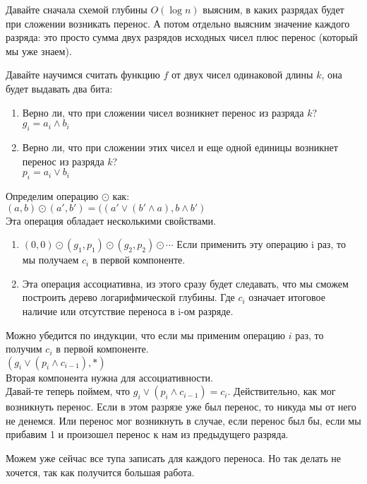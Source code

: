 Давайте сначала схемой глубины $O(\log n)$ выясним, в каких разрядах будет при сложении возникать перенос.
А потом отдельно выясним значение каждого разряда: это просто сумма двух разрядов исходных чисел плюс перенос (который мы уже знаем).

Давайте научимся считать функцию $f$ от двух чисел одинаковой длины $k$, она будет выдавать два бита:
\begin{enumerate}
	\item Верно ли, что при сложении чисел возникнет перенос из разряда $k$?\\
	$g_i = a_i \wedge b_i$
	\item Верно ли, что при сложении этих чисел и еще одной единицы возникнет перенос из разряда $k$?\\
	$p_i = a_i \vee b_i$
\end{enumerate}

Определим операцию $\odot$ как:\\
$(a, b) \odot (a', b') = ((a' \vee (b' \wedge a), b \wedge b')$\\

Эта операция обладает несколькими свойствами. 
 
\begin{enumerate}
	\item $(0, 0) \odot (g_1, p_1) \odot (g_2, p_2) \odot \cdots$
	Если применить эту операцию i раз, то мы получаем $c_i$ в первой компоненте.
	\item Эта операция ассоциативна, из этого сразу будет следавать, что мы 
	сможем построить дерево логарифмической глубины. Где $c_i$ означает итоговое наличие или отсутствие переноса в i-ом разряде.
\end{enumerate}

Можно убедится по индукции, что если мы применим операцию $i$ раз, то получим $c_i$ в первой компоненте.\\
$(g_i \vee (p_i \wedge c_{i - 1}), *)$\\
Вторая компонента нужна для ассоциативности.\\

Давай-те теперь поймем, что $g_i \vee (p_i \wedge c_{i - 1}) = c_i$. Действительно, как мог возникнуть перенос. 
Если в этом разрязе уже был перенос, то никуда мы от него не денемся. Или перенос мог возникнуть в случае, если перенос 
был бы, если мы прибавим 1 и произошел перенос к нам из предыдущего разряда.

Можем уже сейчас все тупа записать для каждого переноса. Но так делать не хочется, 
так как получится большая работа. 

